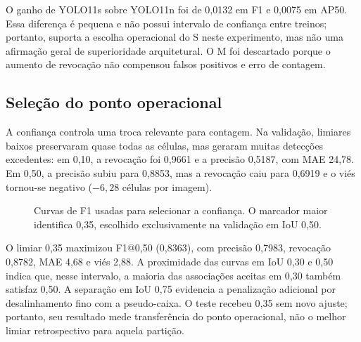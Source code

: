 O ganho de YOLO11s sobre YOLO11n foi de 0,0132 em F1 e 0,0075 em AP50. Essa
diferen\c{c}a \'e pequena e n\~ao possui intervalo de confian\c{c}a entre treinos;
portanto, suporta a escolha operacional do S neste experimento, mas n\~ao uma
afirma\c{c}\~ao geral de superioridade arquitetural. O M foi descartado porque
o aumento de revoca\c{c}\~ao n\~ao compensou falsos positivos e erro de contagem.

\FloatBarrier
\subsection{Sele\c{c}\~ao do ponto operacional}

A confian\c{c}a controla uma troca relevante para contagem. Na valida\c{c}\~ao,
limiares baixos preservaram quase todas as c\'elulas, mas geraram muitas
detec\c{c}\~oes excedentes: em 0,10, a revoca\c{c}\~ao foi 0,9661 e a precis\~ao
0,5187, com MAE 24,78. Em 0,50, a precis\~ao subiu para 0,8853, mas a revoca\c{c}\~ao
caiu para 0,6919 e o vi\'es tornou-se negativo ($-6,28$ c\'elulas por imagem).

\begin{figure}[htbp]
\centering
{}
\caption{Curvas de F1 usadas para selecionar a confian\c{c}a. O marcador maior
identifica 0,35, escolhido exclusivamente na valida\c{c}\~ao em IoU 0,50.}
\label{fig:limiar-pgf}
\end{figure}

O limiar 0,35 maximizou F1@0,50 (0,8363), com precis\~ao 0,7983, revoca\c{c}\~ao
0,8782, MAE 4,68 e vi\'es 2,88. A proximidade das curvas em IoU 0,30 e 0,50
indica que, nesse intervalo, a maioria das associa\c{c}\~oes aceitas em 0,30
tamb\'em satisfaz 0,50. A separa\c{c}\~ao em IoU 0,75 evidencia a penaliza\c{c}\~ao
adicional por desalinhamento fino com a pseudo-caixa. O teste recebeu 0,35 sem
novo ajuste; portanto, seu resultado mede transfer\^encia do ponto operacional,
n\~ao o melhor limiar retrospectivo para aquela parti\c{c}\~ao.

